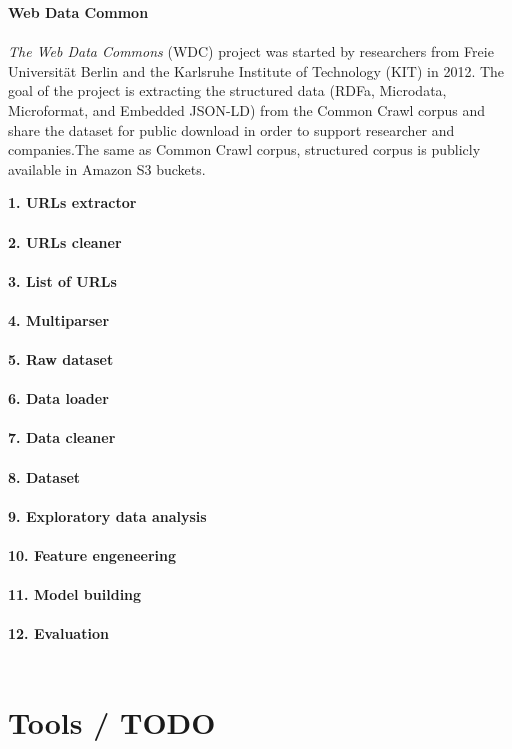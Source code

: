 \vspace{5mm} 
\noindent\textbf{Web Data Common}\\\\
\textit{The Web Data Commons} (WDC) project was started by researchers from Freie Universität Berlin and the Karlsruhe Institute of Technology (KIT) in 2012. The goal of the project is extracting the structured data (RDFa, Microdata, Microformat, and Embedded JSON-LD) from the Common Crawl corpus and share the dataset for public download in order to support researcher and companies.The same as Common Crawl corpus, structured corpus is publicly available in Amazon S3 buckets.

\vspace{5mm} 
\noindent\textbf{1. URLs extractor}\\\\
\vspace{5mm} 
\noindent\textbf{2. URLs cleaner}\\\\
\vspace{5mm} 
\noindent\textbf{3. List of URLs}\\\\
\vspace{5mm} 
\noindent\textbf{4. Multiparser}\\\\
\vspace{5mm} 
\noindent\textbf{5. Raw dataset}\\\\
\vspace{5mm} 
\noindent\textbf{6. Data loader}\\\\
\vspace{5mm} 
\noindent\textbf{7. Data cleaner}\\\\
\vspace{5mm} 
\noindent\textbf{8. Dataset}\\\\
\vspace{5mm} 
\noindent\textbf{9. Exploratory data analysis}\\\\
\vspace{5mm} 
\noindent\textbf{10. Feature engeneering}\\\\
\vspace{5mm} 
\noindent\textbf{11. Model building}\\\\
\vspace{5mm} 
\noindent\textbf{12. Evaluation}\\\\

\section{Tools / TODO}


